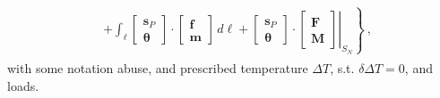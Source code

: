 \documentclass[letterpaper,10pt,english]{jupyterBook}
\begin{document}
\begin{equation*}
\begin{split}
\begin{aligned}
   & + \left. \int_{\ell} \begin{bmatrix} \mathbf{s}_P \\ \boldsymbol{\theta} \end{bmatrix} \cdot \begin{bmatrix} \mathbf{f} \\ \mathbf{m} \end{bmatrix} \, d \ell + \left. \begin{bmatrix} \mathbf{s}_P \\ \boldsymbol{\theta} \end{bmatrix} \cdot \begin{bmatrix} \mathbf{F} \\ \mathbf{M} \end{bmatrix} \right|_{S_N}  \right\} \ ,
\end{aligned}\end{split}
\end{equation*}
\sphinxAtStartPar
with some notation abuse, and prescribed temperature \(\Delta T\), s.t. \(\delta \Delta T = 0\), and loads.
\end{document}
